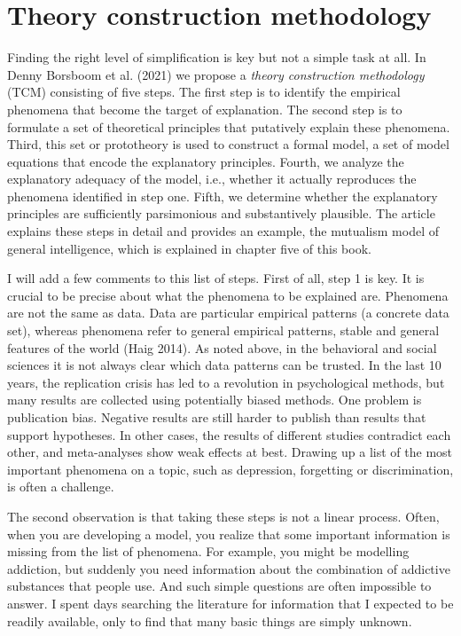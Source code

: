 \documentclass[
  letterpaper,
]{scrbook}
\begin{document}
\hypertarget{theory-construction-methodology}{%
\section{Theory construction
methodology}\label{theory-construction-methodology}}

Finding the right level of simplification is key but not a simple task
at all. In Denny Borsboom et al. (2021) we propose a \emph{theory
construction methodology} (TCM) consisting of five steps. The first step
is to identify the empirical phenomena that become the target of
explanation. The second step is to formulate a set of theoretical
principles that putatively explain these phenomena. Third, this set or
prototheory is used to construct a formal model, a set of model
equations that encode the explanatory principles. Fourth, we analyze the
explanatory adequacy of the model, i.e., whether it actually reproduces
the phenomena identified in step one. Fifth, we determine whether the
explanatory principles are sufficiently parsimonious and substantively
plausible. The article explains these steps in detail and provides an
example, the mutualism model of general intelligence, which is explained
in chapter five of this book.

I will add a few comments to this list of steps. First of all, step 1 is
key. It is crucial to be precise about what the phenomena to be
explained are. Phenomena are not the same as data. Data are particular
empirical patterns (a concrete data set), whereas phenomena refer to
general empirical patterns, stable and general features of the world
(Haig 2014). As noted above, in the behavioral and social sciences it is
not always clear which data patterns can be trusted. In the last 10
years, the replication crisis has led to a revolution in psychological
methods, but many results are collected using potentially biased
methods. One problem is publication bias. Negative results are still
harder to publish than results that support hypotheses. In other cases,
the results of different studies contradict each other, and
meta-analyses show weak effects at best. Drawing up a list of the most
important phenomena on a topic, such as depression, forgetting or
discrimination, is often a challenge.

The second observation is that taking these steps is not a linear
process. Often, when you are developing a model, you realize that some
important information is missing from the list of phenomena. For
example, you might be modelling addiction, but suddenly you need
information about the combination of addictive substances that people
use. And such simple questions are often impossible to answer. I spent
days searching the literature for information that I expected to be
readily available, only to find that many basic things are simply
unknown.
\end{document}
